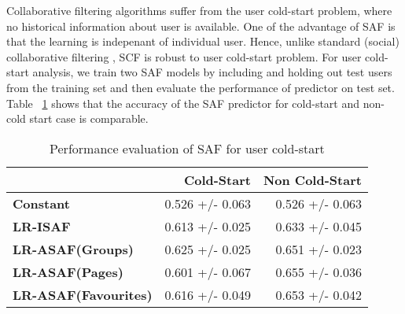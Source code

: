 Collaborative filtering algorithms suffer from the user cold-start problem,
where no historical information about user is available. One of the advantage of SAF is that 
the learning is indepenant of individual user. Hence, unlike standard (social) collaborative
filtering , SCF is robust to user cold-start problem.  For user cold-start analysis, we train
two SAF models by including and holding out test users from the training set and then evaluate
the performance of predictor on test set. Table ~\ref{tab:coldstart} shows that the accuracy 
of the SAF predictor for cold-start and non-cold start case is comparable.  

\begin{table}[t!]
\centering
\begin{tabular}{|>{\small}l|>{\small}r|>{\small}r|}
\hline
& \textbf{Cold-Start} & \textbf{Non Cold-Start}\\
\hline
\textbf{Constant} & 0.526  +/-  0.063 & 0.526  +/-  0.063 \\
\hline
\textbf{LR-ISAF} & 0.613 +/- 0.025 & 0.633  +/-  0.045 \\
\hline
\textbf{LR-ASAF(Groups)} & 0.625  +/-  0.025 & 0.651  +/-  0.023 \\
\hline
\textbf{LR-ASAF(Pages)} & 0.601  +/-  0.067 & 0.655  +/-  0.036 \\
\hline
\textbf{LR-ASAF(Favourites)} & 0.616  +/-  0.049 & 0.653  +/-  0.042\\
\hline
\end{tabular}
\caption{Performance evaluation of SAF for user cold-start}
\label{tab:coldstart}
\end{table}